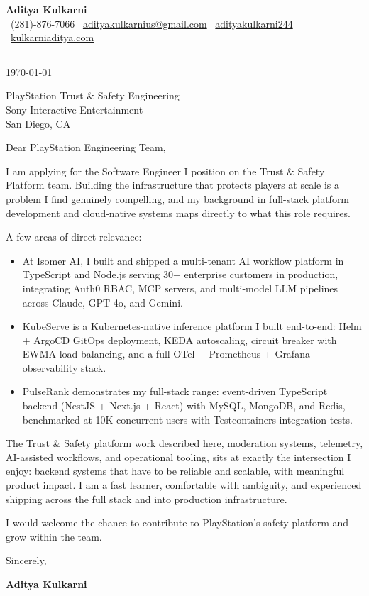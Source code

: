 \documentclass[11pt,a4paper]{article}
\makeatletter
\newcommand{\CLheader}{%
  \begin{center}
    {\Large \textbf{Aditya Kulkarni}}\\[4pt]
    \textcolor{brand}{\faPhone}\ (281)-876-7066 \quad
    \textcolor{brand}{\faEnvelope}\ \href{mailto:adityakulkarnius@gmail.com}{adityakulkarnius@gmail.com} \quad
    \textcolor{brand}{\faLinkedin}\ \href{https://linkedin.com/in/adityakulkarni244}{adityakulkarni244} \quad
    \textcolor{brand}{\faGlobe}\ \href{https://kulkarniaditya.com}{kulkarniaditya.com}
  \end{center}
  \vspace{4pt}
  \textcolor{brand}{\rule{\linewidth}{1.2pt}}
  \vspace{6pt}
}
\makeatother
\begin{document}
\CLheader

\today

\vspace{8pt}

PlayStation Trust \& Safety Engineering\\
Sony Interactive Entertainment\\
San Diego, CA

\vspace{8pt}

Dear PlayStation Engineering Team,

\vspace{6pt}

I am applying for the Software Engineer I position on the Trust \& Safety Platform team. Building the infrastructure that protects players at scale is a problem I find genuinely compelling, and my background in full-stack platform development and cloud-native systems maps directly to what this role requires.

\vspace{6pt}

A few areas of direct relevance:

\vspace{4pt}
\begin{itemize}
  \item[\textcolor{brand}{\faAngleRight}] At Isomer AI, I built and shipped a multi-tenant AI workflow platform in TypeScript and Node.js serving 30+ enterprise customers in production, integrating Auth0 RBAC, MCP servers, and multi-model LLM pipelines across Claude, GPT-4o, and Gemini.
  \item[\textcolor{brand}{\faAngleRight}] KubeServe is a Kubernetes-native inference platform I built end-to-end: Helm + ArgoCD GitOps deployment, KEDA autoscaling, circuit breaker with EWMA load balancing, and a full OTel + Prometheus + Grafana observability stack.
  \item[\textcolor{brand}{\faAngleRight}] PulseRank demonstrates my full-stack range: event-driven TypeScript backend (NestJS + Next.js + React) with MySQL, MongoDB, and Redis, benchmarked at 10K concurrent users with Testcontainers integration tests.
\end{itemize}

\vspace{6pt}

The Trust \& Safety platform work described here, moderation systems, telemetry, AI-assisted workflows, and operational tooling, sits at exactly the intersection I enjoy: backend systems that have to be reliable and scalable, with meaningful product impact. I am a fast learner, comfortable with ambiguity, and experienced shipping across the full stack and into production infrastructure.

\vspace{6pt}

I would welcome the chance to contribute to PlayStation's safety platform and grow within the team.

\vspace{12pt}

Sincerely,

\vspace{6pt}
\textbf{Aditya Kulkarni}
\end{document}
